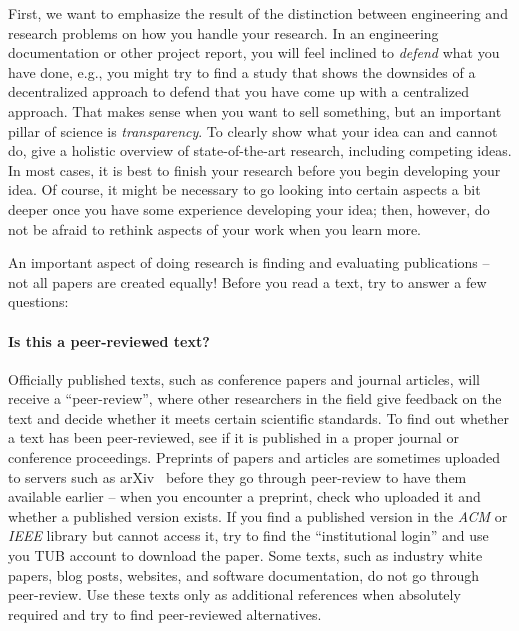 \documentclass[a4]{article}
\begin{document}
First, we want to emphasize the result of the distinction between engineering and research problems on how you handle your research.
In an engineering documentation or other project report, you will feel inclined to \emph{defend} what you have done, e.g., you might try to find a study that shows the downsides of a decentralized approach to defend that you have come up with a centralized approach.
That makes sense when you want to sell something, but an important pillar of science is \emph{transparency}.
To clearly show what your idea can and cannot do, give a holistic overview of state-of-the-art research, including competing ideas.
In most cases, it is best to finish your research before you begin developing your idea.
Of course, it might be necessary to go looking into certain aspects a bit deeper once you have some experience developing your idea; then, however, do not be afraid to rethink aspects of your work when you learn more.

An important aspect of doing research is finding and evaluating publications -- not all papers are created equally!
Before you read a text, try to answer a few questions:

\paragraph{Is this a peer-reviewed text?}
Officially published texts, such as conference papers and journal articles, will receive a ``peer-review'', where other researchers in the field give feedback on the text and decide whether it meets certain scientific standards.
To find out whether a text has been peer-reviewed, see if it is published in a proper journal or conference proceedings.
Preprints of papers and articles are sometimes uploaded to servers such as arXiv~\cite{arxiv} before they go through peer-review to have them available earlier -- when you encounter a preprint, check who uploaded it and whether a published version exists.
If you find a published version in the \emph{ACM} or \emph{IEEE} library but cannot access it, try to find the ``institutional login'' and use you TUB account to download the paper.
Some texts, such as industry white papers, blog posts, websites, and software documentation, do not go through peer-review.
Use these texts only as additional references when absolutely required and try to find peer-reviewed alternatives.
\end{document}
